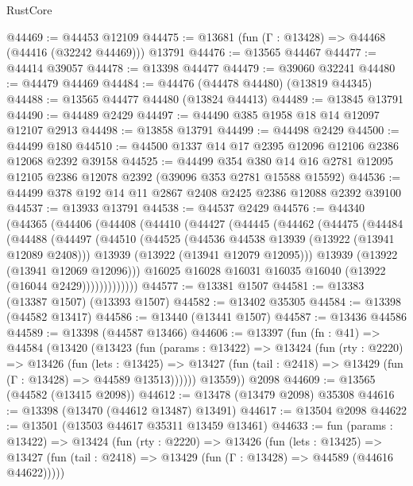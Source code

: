 \begin{lexlean}{RustCore}
\begin{coremodule}
@44469 := @44453 @12109
@44475 := @13681 (fun (Γ : @13428) => @44468 (@44416 (@32242 @44469))) @13791
@44476 := @13565 @44467
@44477 := @44414 @39057
@44478 := @13398 @44477
@44479 := @39060 @32241
@44480 := @44479 @44469
@44484 := @44476 (@44478 @44480) (@13819 @44345)
@44488 := @13565 @44477 @44480 (@13824 @44413)
@44489 := @13845 @13791
@44490 := @44489 @2429
@44497 := @44490 @385 @1958 @18 @14 @12097 @12107 @2913
@44498 := @13858 @13791
@44499 := @44498 @2429
@44500 := @44499 @180
@44510 := @44500 @1337 @14 @17 @2395 @12096 @12106 @2386 @12068 @2392 @39158
@44525 := @44499
    @354
    @380
    @14
    @16
    @2781
    @12095
    @12105
    @2386
    @12078
    @2392
    (@39096 @353 @2781 @15588 @15592)
@44536 := @44499 @378 @192 @14 @11 @2867 @2408 @2425 @2386 @12088 @2392 @39100
@44537 := @13933 @13791
@44538 := @44537 @2429
@44576 := @44340
    (@44365
      (@44406
        (@44408
          (@44410
            (@44427
              (@44445
                (@44462
                  (@44475
                    (@44484
                      (@44488
                        (@44497
                          (@44510
                            (@44525
                              (@44536 @44538 @13939 (@13922 (@13941 @12089 @2408)))
                              @13939
                              (@13922 (@13941 @12079 @12095)))
                            @13939
                            (@13922 (@13941 @12069 @12096)))
                          @16025
                          @16028
                          @16031
                          @16035
                          @16040
                          (@13922 (@16044 @2429)))))))))))))
@44577 := @13381 @1507
@44581 := @13383 (@13387 @1507) (@13393 @1507)
@44582 := @13402 @35305
@44584 := @13398 (@44582 @13417)
@44586 := @13440 (@13441 @1507)
@44587 := @13436 @44586
@44589 := @13398 (@44587 @13466)
@44606 := @13397
    (fun (fn : @41) =>
    @44584
      (@13420
        (@13423
          (fun (params : @13422) =>
          @13424
            (fun (rty : @2220) =>
            @13426
              (fun (lets : @13425) =>
              @13427 (fun (tail : @2418) => @13429 (fun (Γ : @13428) => @44589 @13513))))))
        @13559))
    @2098
@44609 := @13565 (@44582 (@13415 @2098))
@44612 := @13478 (@13479 @2098) @35308
@44616 := @13398 (@13470 (@44612 @13487) @13491)
@44617 := @13504 @2098
@44622 := @13501 (@13503 @44617 @35311 @13459 @13461)
@44633 := fun (params : @13422) =>
  @13424
    (fun (rty : @2220) =>
    @13426
      (fun (lets : @13425) =>
      @13427 (fun (tail : @2418) => @13429 (fun (Γ : @13428) => @44589 (@44616 @44622)))))

\end{coremodule}
\end{lexlean}
